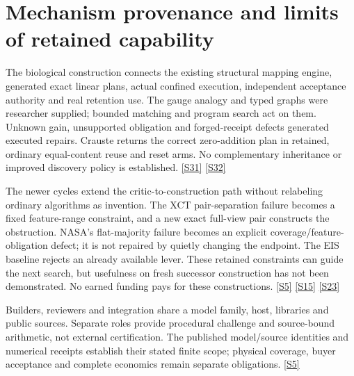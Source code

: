 \documentclass[11pt,letterpaper]{article}
\begin{document}
\section{Mechanism provenance and limits of retained capability}
The biological construction connects the existing structural mapping engine, generated exact linear plans, actual confined execution, independent acceptance authority and real retention use. The gauge analogy and typed graphs were researcher supplied; bounded matching and program search act on them. Unknown gain, unsupported obligation and forged-receipt defects generated executed repairs. Crauste returns the correct zero-addition plan in retained, ordinary equal-content reuse and reset arms. No complementary inheritance or improved discovery policy is established. \href{https://github.com/MontrealAI/AGI-Alpha-Invention-Flywheel-Lab/blob/2b7a58e6e6593ae48da6f7f33865db94868c957f/evidence/overnight-008/science-development/PROBE_RESULT.json}{[S31]} \href{https://github.com/MontrealAI/AGI-Alpha-Invention-Flywheel-Lab/blob/2b7a58e6e6593ae48da6f7f33865db94868c957f/evidence/overnight-008/retained-crauste-development-r1/artifacts/REPORT.json}{[S32]}\par
The newer cycles extend the critic-to-construction path without relabeling ordinary algorithms as invention. The XCT pair-separation failure becomes a fixed feature-range constraint, and a new exact full-view pair constructs the obstruction. NASA's flat-majority failure becomes an explicit coverage/feature-obligation defect; it is not repaired by quietly changing the endpoint. The EIS baseline rejects an already available lever. These retained constraints can guide the next search, but usefulness on fresh successor construction has not been demonstrated. No earned funding pays for these constructions. \href{https://github.com/MontrealAI/AGI-Alpha-Invention-Flywheel-Lab/blob/2b7a58e6e6593ae48da6f7f33865db94868c957f/evidence/overnight-008/xct-recovery/xct-fraction-r2-bound/artifacts/REPORT.json}{[S5]} \href{https://github.com/MontrealAI/AGI-Alpha-Invention-Flywheel-Lab/blob/2b7a58e6e6593ae48da6f7f33865db94868c957f/research/nasa008/development/STRATIFIED_COVERAGE.json}{[S15]} \href{https://github.com/MontrealAI/AGI-Alpha-Invention-Flywheel-Lab/blob/2b7a58e6e6593ae48da6f7f33865db94868c957f/research/eis008/development/run-r2/REPORT.json}{[S23]}\par
Builders, reviewers and integration share a model family, host, libraries and public sources. Separate roles provide procedural challenge and source-bound arithmetic, not external certification. The published model/source identities and numerical receipts establish their stated finite scope; physical coverage, buyer acceptance and complete economics remain separate obligations. \href{https://github.com/MontrealAI/AGI-Alpha-Invention-Flywheel-Lab/blob/2b7a58e6e6593ae48da6f7f33865db94868c957f/evidence/overnight-008/xct-recovery/xct-fraction-r2-bound/artifacts/REPORT.json}{[S5]}\par
\end{document}
